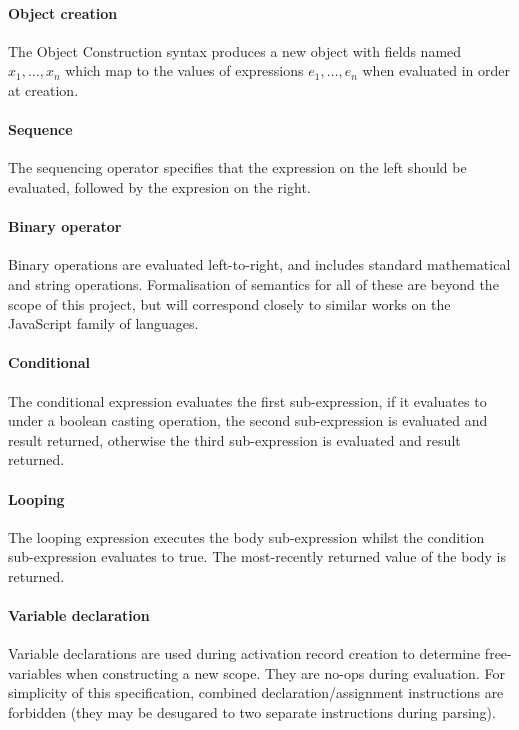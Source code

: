 \documentclass[a4paper]{article}
\begin{document}
\paragraph{Object creation}  The Object Construction syntax produces a new object
with fields named $x_1, \ldots, x_n$ which map to the values of expressions
$e_1, \ldots, e_n$ when evaluated in order at creation.

\paragraph{Sequence} The sequencing operator specifies that the expression on the left should be
evaluated, followed by the expresion on the right.

\paragraph{Binary operator} Binary operations are evaluated left-to-right, and includes standard
mathematical and string operations. Formalisation of semantics for all of these
are beyond the scope of this project, but will correspond closely to similar
works on the JavaScript family of languages.

\paragraph{Conditional} The conditional expression evaluates the first sub-expression, if it evaluates
to  under a boolean casting operation, the second sub-expression is
evaluated and result returned, otherwise the third sub-expression is evaluated
and result returned.

\paragraph{Looping} The looping expression executes the body sub-expression whilst the condition
sub-expression evaluates to true. The most-recently returned value of the body
is returned.

\paragraph{Variable declaration} Variable declarations are used during activation
record creation to determine free-variables when constructing a new scope. They
are no-ops during evaluation. For simplicity of this specification, combined
declaration/assignment instructions are forbidden (they may be desugared to two
separate instructions during parsing).
\end{document}
